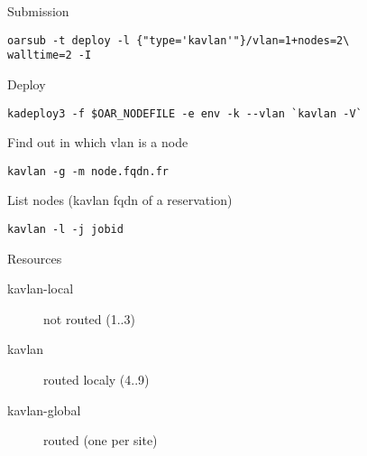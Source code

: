 Submission
\begin{verbatim}
oarsub -t deploy -l {"type='kavlan'"}/vlan=1+nodes=2\
walltime=2 -I
\end{verbatim}

Deploy
\begin{verbatim}
kadeploy3 -f $OAR_NODEFILE -e env -k --vlan `kavlan -V`
\end{verbatim}

Find out in which vlan is a node
\begin{verbatim}
kavlan -g -m node.fqdn.fr
\end{verbatim}

List nodes (kavlan fqdn of a reservation)
\begin{verbatim}
kavlan -l -j jobid
\end{verbatim}

Resources
\begin{description}
\item[kavlan-local] not routed (1..3)
\item[kavlan] routed localy (4..9)
\item[kavlan-global] routed (one per site)
\end{description}